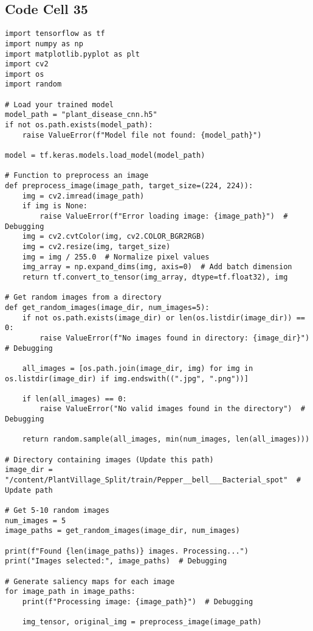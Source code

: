 \documentclass{article}
\begin{document}
\subsection*{Code Cell 35}
\begin{lstlisting}
import tensorflow as tf
import numpy as np
import matplotlib.pyplot as plt
import cv2
import os
import random

# Load your trained model
model_path = "plant_disease_cnn.h5"
if not os.path.exists(model_path):
    raise ValueError(f"Model file not found: {model_path}")

model = tf.keras.models.load_model(model_path)

# Function to preprocess an image
def preprocess_image(image_path, target_size=(224, 224)):
    img = cv2.imread(image_path)
    if img is None:
        raise ValueError(f"Error loading image: {image_path}")  # Debugging
    img = cv2.cvtColor(img, cv2.COLOR_BGR2RGB)
    img = cv2.resize(img, target_size)
    img = img / 255.0  # Normalize pixel values
    img_array = np.expand_dims(img, axis=0)  # Add batch dimension
    return tf.convert_to_tensor(img_array, dtype=tf.float32), img

# Get random images from a directory
def get_random_images(image_dir, num_images=5):
    if not os.path.exists(image_dir) or len(os.listdir(image_dir)) == 0:
        raise ValueError(f"No images found in directory: {image_dir}")  # Debugging

    all_images = [os.path.join(image_dir, img) for img in os.listdir(image_dir) if img.endswith((".jpg", ".png"))]

    if len(all_images) == 0:
        raise ValueError("No valid images found in the directory")  # Debugging

    return random.sample(all_images, min(num_images, len(all_images)))

# Directory containing images (Update this path)
image_dir = "/content/PlantVillage_Split/train/Pepper__bell___Bacterial_spot"  # Update path

# Get 5-10 random images
num_images = 5
image_paths = get_random_images(image_dir, num_images)

print(f"Found {len(image_paths)} images. Processing...")
print("Images selected:", image_paths)  # Debugging

# Generate saliency maps for each image
for image_path in image_paths:
    print(f"Processing image: {image_path}")  # Debugging

    img_tensor, original_img = preprocess_image(image_path)


\end{lstlisting}
\end{document}
